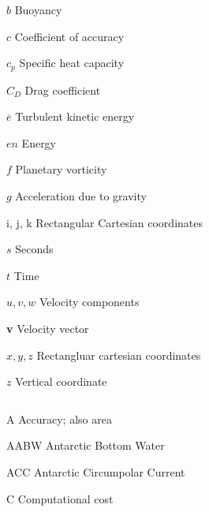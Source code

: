 \documentclass[a4paper,12pt, openright, titlepage]{book}
\begin{document}
\begin{abbrv}
\item[ ] $ $%
\item[$b$]                   Buoyancy\\
\item[$c$]                   Coefficient of accuracy\\
\item[$c_{p}$]               Specific heat capacity\\
\item[$C_{D}$]               Drag coefficient\\
\item[$\overline{e}$]        Turbulent kinetic energy\\
\item[$en$]                  Energy\\
\item[$f$]                   Planetary vorticity\\
\item[$g$]                   Acceleration due to gravity\\
\item[i, j, k]               Rectangular Cartesian coordinates\\
\item[$s$]                   Seconds\\
\item[$t$]                   Time\\
\item[$u,v,w$]               Velocity components\\
\item[\textbf{v}]            Velocity vector\\
\item[$x, y, z$]             Rectangluar cartesian coordinates\\
\item[$z$]                   Vertical coordinate\\
\item[ ] $ $%
\item[A]                     Accuracy; also area\\
\item[AABW]                  Antarctic Bottom Water\\
\item[ACC]                   Antarctic Circumpolar Current\\
\item[C]                     Computational cost\\

\end{abbrv}
\end{document}
